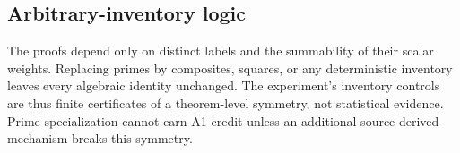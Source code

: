 \subsection{Arbitrary-inventory logic}

The proofs depend only on distinct labels and the summability of their scalar
weights.  Replacing primes by composites, squares, or any deterministic
inventory leaves every algebraic identity unchanged.  The experiment's
inventory controls are thus finite certificates of a theorem-level symmetry,
not statistical evidence.  Prime specialization cannot earn A1 credit unless
an additional source-derived mechanism breaks this symmetry.
